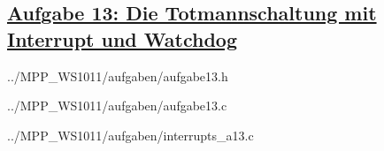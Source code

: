 \subsection*
{\href{http://cst.mi.fu-berlin.de/intern/19606-P-MPP/Aufgaben/040402.html}
{Aufgabe 13: Die Totmannschaltung mit Interrupt und Watchdog}}


{../MPP_WS1011/aufgaben/aufgabe13.h}


{../MPP_WS1011/aufgaben/aufgabe13.c}


{../MPP_WS1011/aufgaben/interrupts_a13.c}
